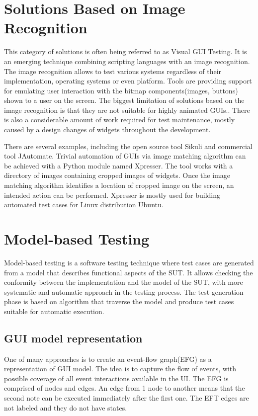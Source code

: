 \section{Solutions Based on Image Recognition}
This category of solutions is often being referred to as Visual GUI Testing. It is an emerging technique combining scripting languages with an image recognition. The image recognition allows to test various systems regardless of their implementation, operating systems or even platform. Tools are providing support for emulating user interaction with the bitmap components(images, buttons) shown to a user on the screen. The biggest limitation of solutions based on the image recognition is that they are not suitable for highly animated GUIs.\cite{guitesting}. There is also a considerable amount of work required for test maintenance, mostly caused by a design changes of widgets throughout the development.   

There are several examples, including the open source tool Sikuli and commercial tool JAutomate. Trivial automation of GUIs via image matching algorithm can be achieved with a Python module named Xpresser. The tool works with a directory of images containing cropped images of widgets. Once the image matching algorithm identifies a location of cropped image on the screen, an intended action can be performed.\cite{xpresser} Xpresser is mostly used for building automated test cases for Linux distribution Ubuntu.

\section{Model-based Testing}
Model-based testing is a software testing technique where test cases are generated from a model that describes functional aspects of the SUT. It allows checking the conformity between the implementation and the model of the SUT, with more systematic and automatic approach in the testing process. The test generation phase is based on algorithm that traverse the model and produce test cases suitable for automatic execution. 

\subsection{GUI model representation}

One of many approaches is to create an event-flow graph(EFG) as a representation of GUI model. The idea is to capture the flow of events, with possible coverage of all event interactions available in the UI.  The EFG is comprised of nodes and edges. An edge from 1 node to another means that the second note can be executed immediately after the first one. The EFT edges are not labeled and they do not have states. 

